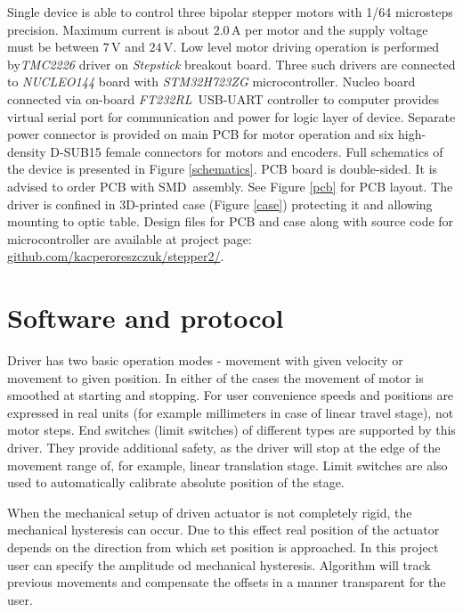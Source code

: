 \documentclass[10pt,article]{article}
\begin{document}
Single device is able to control three bipolar stepper motors with 1/64 microsteps precision. Maximum current is about $2.0$\,A per motor and the supply voltage must be between $7$\,V and $24$\,V.
Low level motor driving operation  is performed by\textit{TMC2226} driver on \textit{Stepstick} breakout board. Three such drivers are connected to \textit{NUCLEO144}  board with \textit{STM32H723ZG} microcontroller. Nucleo board connected via on-board \textit{FT232RL}\ USB-UART controller to computer provides virtual serial port for communication and power for logic layer of device. Separate power connector is provided on main PCB for motor operation and six high-density D-SUB15 female connectors for motors and encoders. Full schematics of the device is presented in Figure \ref{schematics}. PCB board is double-sided. It is advised to order PCB with SMD\ assembly. See Figure \ref{pcb} for PCB layout.  The driver is confined in 3D-printed case (Figure \ref{case}) protecting it and allowing mounting to optic table. 
Design files for PCB and case along with source code for microcontroller are available at project page: \url{github.com/kacperoreszczuk/stepper2/}. 

\newpage
\section{Software and protocol}

Driver has two basic operation modes - movement with given velocity or movement to given position. In either of the cases the movement of motor is smoothed at starting and stopping. For user convenience speeds and positions are expressed in real units (for example millimeters in case of linear travel stage), not motor steps. End switches (limit switches) of different types are supported by this driver. They provide additional safety, as the driver will stop at the edge of the movement range of, for example, linear translation stage. Limit switches are also used to automatically calibrate absolute position of the stage.

When the mechanical setup of driven actuator is not completely rigid, the mechanical hysteresis can occur. Due to this effect real position of the  actuator depends on the direction from which set position is approached. In this project user can specify the amplitude od mechanical hysteresis. Algorithm will track previous movements and compensate the offsets in a manner transparent for the user.  
\end{document}
